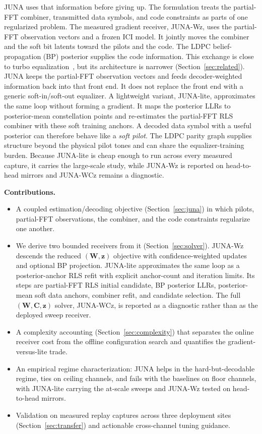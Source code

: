 \documentclass[journal]{IEEEtran}
\newcommand{\juna}{JUNA}
\newcommand{\junalite}{JUNA-lite}
\newcommand{\junawz}{JUNA-Wz}
\newcommand{\junawcz}{JUNA-WCz}
\begin{document}
\juna{} uses that information before giving up. The formulation treats the
partial-FFT combiner, transmitted data symbols, and code constraints as parts of
one regularized problem. The measured gradient receiver, \junawz{}, uses the
partial-FFT observation vectors and a frozen ICI model. It jointly moves the
combiner and the soft bit latents toward the pilots and the code. The LDPC
belief-propagation (BP) posterior supplies the code information. This exchange
is close to turbo equalization~\cite{douillard1995turbo,
tuchler2002turbo,jhuang2011progressive}, but its architecture is narrower
(Section~\ref{sec:related}). \juna{} keeps the partial-FFT observation vectors
and feeds decoder-weighted information back into that front end. It does not
replace the front end with a generic soft-in/soft-out equalizer. A lightweight
variant, \junalite{}, approximates the same loop without forming a gradient. It
maps the posterior LLRs to posterior-mean constellation points and re-estimates
the partial-FFT RLS combiner with these soft training anchors. A decoded data
symbol with a useful posterior can therefore behave like a \emph{soft pilot}.
The LDPC parity graph supplies structure beyond the physical pilot tones and can
share the equalizer-training burden. Because \junalite{} is cheap enough to run across
every measured capture, it carries the large-scale study, while \junawz{} is
reported on head-to-head mirrors and \junawcz{} remains a diagnostic.

\textbf{Contributions.}
\begin{itemize}
\item A coupled estimation/decoding objective (Section~\ref{sec:juna}) in which
  pilots, partial-FFT observations, the combiner, and the code constraints regularize
  one another.
\item We derive two bounded receivers from it (Section~\ref{sec:solver}).
  \junawz{} descends the reduced $(\mathbf W,\mathbf z)$ objective with
  confidence-weighted updates and optional BP projection. \junalite{}
  approximates the same loop as a posterior-anchor RLS refit with explicit
  anchor-count and iteration limits. Its steps are partial-FFT RLS initial candidate, BP
  posterior LLRs, posterior-mean soft data anchors, combiner refit, and
  candidate selection. The full $(\mathbf W,\mathbf C,\mathbf z)$
  solver, \junawcz{}, is reported as a diagnostic rather than as the deployed
  sweep receiver.
\item A complexity accounting (Section~\ref{sec:complexity}) that separates the
  online receiver cost from the offline configuration search and quantifies the
  gradient-versus-lite trade.
\item An empirical regime characterization: \juna{} helps in the
  hard-but-decodable regime, ties on ceiling channels, and fails with the
  baselines on floor channels, with \junalite{} carrying the at-scale sweeps and
  \junawz{} tested on head-to-head mirrors.
\item Validation on measured replay captures across three deployment sites
  (Section~\ref{sec:transfer}) and actionable cross-channel tuning guidance.
\end{itemize}
\end{document}
